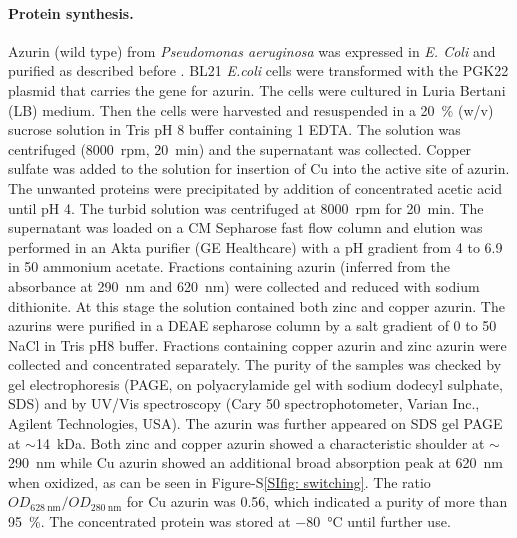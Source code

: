 \paragraph*{Protein synthesis.}
Azurin (wild type) from \textit{Pseudomonas aeruginosa} was expressed in \textit{E. Coli} and purified as described before \citep{kamp1990purification}.
BL21 \textit{E.coli} cells were transformed with the PGK22 plasmid that carries the gene for azurin.
The cells were cultured in Luria Bertani (LB) medium.
Then the cells were harvested and resuspended in a \SI{20}{\percent} (w/v) sucrose solution in Tris pH 8 buffer containing \SI{1}{\mM} EDTA.
The solution was centrifuged (\SI{8000}{ rpm}, \SI{20}{\minute}) and the supernatant was collected.
Copper sulfate was added to the solution for insertion of Cu into the active site of azurin.
The unwanted proteins were precipitated by addition of concentrated acetic acid until pH 4. 
The turbid solution was centrifuged at \SI{8000}{ rpm} for \SI{20}{\minute}.
The supernatant was loaded on a CM Sepharose fast flow column and elution was performed in an Akta purifier (GE Healthcare) with a pH gradient from 4 to 6.9 in 
\SI{50}{\mM} ammonium acetate.
Fractions containing azurin (inferred from the absorbance at \SI{290}{\nm} and \SI{620}{\nm}) were collected and reduced with sodium dithionite.
At this stage the solution contained both zinc and copper azurin.
The azurins were purified in a DEAE sepharose column by a salt gradient of 0 to \SI{50}{\mM} NaCl in Tris pH8 buffer. 
Fractions containing copper azurin and zinc azurin were collected and concentrated separately.
The purity of the samples was checked by gel electrophoresis (PAGE, on polyacrylamide gel with sodium dodecyl sulphate, SDS) and by UV/Vis spectroscopy (Cary 50 spectrophotometer, Varian Inc., Agilent Technologies, USA).
The azurin was further appeared on SDS gel PAGE at $\sim$\SI{14}{ kDa}.
Both zinc and copper azurin showed a characteristic shoulder at ${\sim}$\SI{290}{\nm} while Cu azurin showed an additional 
broad absorption peak at \SI{620}{\nm} when oxidized, as can be seen in Figure-S\ref{SIfig: switching}. 
The ratio $OD_{\SI{628}{\nm}}/OD_{\SI{280}{\nm}}$ for Cu azurin was 0.56, which indicated a purity of more than \SI{95}{\percent}. 
The concentrated protein was stored at \SI{-80}{\celsius} until further use.


